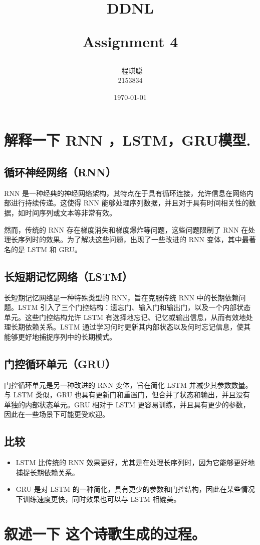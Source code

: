 \documentclass[UTF8]{ctexart}
\title{\normalsize
\LARGE    
DDNL

Assignment 4
}
\author{\
    程琪聪\\
    2153834
}
\date{\today}
\begin{document}
\maketitle
\section{解释一下 RNN ，LSTM，GRU模型.}
\subsection{循环神经网络（RNN）}
RNN 是一种经典的神经网络架构，其特点在于具有循环连接，允许信息在网络内部进行持续传递。这使得 RNN 能够处理序列数据，并且对于具有时间相关性的数据，如时间序列或文本等非常有效。

然而，传统的 RNN 存在梯度消失和梯度爆炸等问题，这些问题限制了 RNN 在处理长序列时的效果。为了解决这些问题，出现了一些改进的 RNN 变体，其中最著名的是 LSTM 和 GRU。
\subsection{长短期记忆网络（LSTM）}
长短期记忆网络是一种特殊类型的 RNN，旨在克服传统 RNN 中的长期依赖问题。LSTM 引入了三个门控结构：遗忘门、输入门和输出门，以及一个内部状态单元。这些门控结构允许 LSTM 有选择地忘记、记忆或输出信息，从而有效地处理长期依赖关系。LSTM 通过学习何时更新其内部状态以及何时忘记信息，使其能够更好地捕捉序列中的长期模式。
\subsection{门控循环单元（GRU）}
门控循环单元是另一种改进的 RNN 变体，旨在简化 LSTM 并减少其参数数量。与 LSTM 类似，GRU 也具有更新门和重置门，但合并了状态和输出，并且没有单独的内部状态单元。GRU 相对于 LSTM 更容易训练，并且具有更少的参数，因此在一些场景下可能更受欢迎。
\subsection{比较}
\begin{itemize}
    \item LSTM 比传统的 RNN 效果更好，尤其是在处理长序列时，因为它能够更好地捕捉长期依赖关系。
    \item GRU 是对 LSTM 的一种简化，具有更少的参数和门控结构，因此在某些情况下训练速度更快，同时效果也可以与 LSTM 相媲美。
\end{itemize}

\section{叙述一下 这个诗歌生成的过程。}
\end{document}
